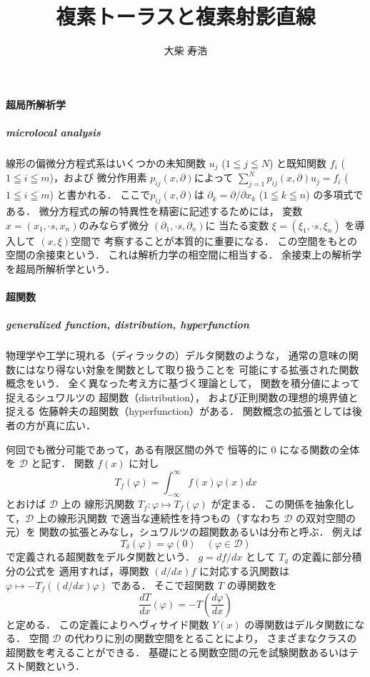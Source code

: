 \documentclass[11pt, a4paper, dvipdfmx]{jsarticle}
\theoremstyle{definition}
\newcommand{\dip}{\displaystyle} %
\newcommand{\pphi}{\varphi} %
\theoremstyle{mystyle}
\numberwithin{equation}{section} %
\begin{document}
\title{複素トーラスと複素射影直線}
\author{大柴 寿浩}
\date{}


\paragraph*{超局所解析学}
\subparagraph*{microlocal analysis}
線形の偏微分方程式系はいくつかの未知関数
$u_j$ ($1\leqq j \leqq N$) と既知関数 $f_i$ ($1\leqq i\leqq m$)，および
微分作用素 $p_{ij}(x, \partial)$によって
$\dip \sum_{j=1}^{N}p_{ij} (x, \partial)u_j=f_i$ ($1\leqq i\leqq m$) と書かれる．
ここで$p_{ij}(x, \partial)$は
$\partial_k=\partial/\partial x_k$ ($1\leqq k \leqq n$) の多項式である．
微分方程式の解の特異性を精密に記述するためには，
変数$x=(x_1,\boldsymbol{\cdot}s, x_n)$のみならず微分 $(\partial_1, \boldsymbol{\cdot}s, \partial_n)$に
当たる変数 $\xi=(\xi_1, \boldsymbol{\cdot}s, \xi_n)$ を導入して $(x, \xi)$空間で
考察することが本質的に重要になる．
この空間をもとの空間の余接束という．
これは解析力学の相空間に相当する．
余接束上の解析学を超局所解析学という．

\paragraph*{超関数}
\subparagraph*{generalized function, distribution, hyperfunction}
物理学や工学に現れる（ディラックの）デルタ関数のような，
通常の意味の関数にはなり得ない対象を関数として取り扱うことを
可能にする拡張された関数概念をいう．
全く異なった考え方に基づく理論として，
関数を積分値によって捉えるシュワルツの
超関数（distribution），
および正則関数の理想的境界値と捉える
佐藤幹夫の超関数（hyperfunction）がある．
関数概念の拡張としては後者の方が真に広い．

何回でも微分可能であって，ある有限区間の外で
恒等的に 0 になる関数の全体を $\mathcal{D}$ と記す．
関数 $f(x)$ に対し
\begin{equation*}
    T_f (\pphi) = \int_{-\infty}^{\infty}f(x)\pphi(x) dx
\end{equation*}
とおけば $\mathcal{D}$ 上の
線形汎関数 $T_f \colon \pphi\mapsto T_f (\pphi)$ が定まる．
この関係を抽象化して，$\mathcal{D}$ 上の線形汎関数
で適当な連続性を持つもの（すなわち $\mathcal{D}$ の双対空間の元）を
関数の拡張とみなし，シュワルツの超関数あるいは分布と呼ぶ．
例えば
\begin{equation*}
    T_\delta(\pphi) = \pphi(0)\quad(\pphi \in \mathcal{D})
\end{equation*}
で定義される超関数をデルタ関数という．
$g=df /dx$ として $T_g$ の定義に部分積分の公式を
適用すれば，導関数 $(d/dx)f$ に対応する汎関数は
$\pphi\mapsto −T_f ((d/dx)\pphi)$ である．
そこで超関数 $T$ の導関数を
\begin{equation*}
    \frac{dT}{dx}(\pphi) = −T\left(\frac{d\pphi}{dx}\right)
\end{equation*}と定める．
この定義によりへヴィサイド関数
$Y (x)$ の導関数はデルタ関数になる．
空間 $\mathcal{D}$ の代わりに別の関数空間をとることにより，
さまざまなクラスの超関数を考えることができる．
基礎にとる関数空間の元を試験関数あるいはテスト関数という．
\end{document}
